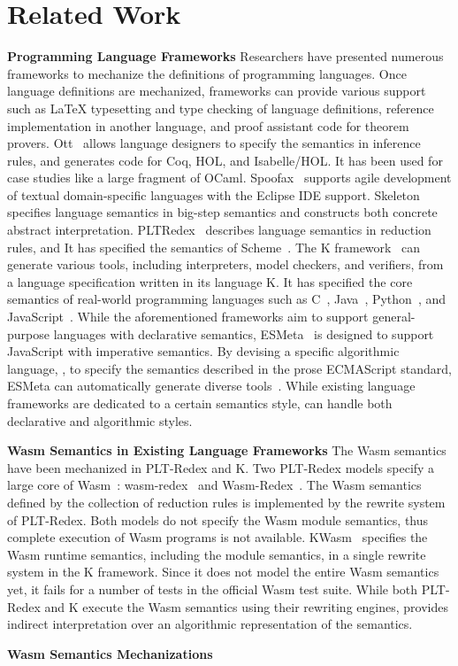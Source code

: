 
\section{Related Work}
\label{sec:related}

\textbf{Programming Language Frameworks}
Researchers have presented numerous frameworks to mechanize the
definitions of programming languages.
Once language definitions are mechanized, frameworks can provide various support
such as LaTeX typesetting and type checking of language definitions,
reference implementation in another language, and 
proof assistant code for theorem provers.
Ott~\cite{ott} allows language designers to specify the semantics in inference rules,
and generates code for Coq, HOL, and Isabelle/HOL.
It has been used for case studies like a large fragment of OCaml.
Spoofax~\cite{spoofax} supports agile development of textual
domain-specific languages with the Eclipse IDE support.
Skeleton~\cite{skeleton} specifies language semantics in big-step semantics
and constructs both concrete abstract interpretation.
PLTRedex~\cite{pltredex} describes language semantics in reduction rules,
and It has specified the semantics of Scheme~\cite{r6rs}.
The K framework~\cite{k} can generate various tools,
including interpreters, model checkers, and verifiers, from a language specification
written in its language K. It has specified the core semantics of real-world programming languages
such as C~\cite{kc}, Java~\cite{kjava}, Python~\cite{kpython}, and JavaScript~\cite{kjs}.
While the aforementioned frameworks aim to support general-purpose languages
with declarative semantics, ESMeta~\cite{esmeta} is designed to
support JavaScript with imperative semantics.
By devising a specific algorithmic language, \ires,
to specify the semantics described in the prose ECMAScript standard,
ESMeta can automatically generate diverse tools~\cite{jiset,jest,jstar,jsaver}.
While existing language frameworks are dedicated to a certain semantics style,
\dslname can handle both declarative and algorithmic styles.

\textbf{Wasm Semantics in Existing Language Frameworks}
The Wasm semantics have been mechanized in PLT-Redex and K.
Two PLT-Redex models specify a large core of Wasm~\cite{wasm-pldi17}:
wasm-redex~\cite{wasm-redex-asumu} and Wasm-Redex~\cite{wasm-redex-adam}.
The Wasm semantics defined by the collection of reduction rules is implemented
by the rewrite system of PLT-Redex.
Both models do not specify the Wasm module semantics, thus complete execution of
Wasm programs is not available.
KWasm~\cite{wasm-k} specifies the Wasm runtime semantics, including the module semantics,
in a single rewrite system in the K framework.
Since it does not model the entire Wasm semantics yet,
it fails for a number of tests in the official Wasm test suite.
While both PLT-Redex and K execute the Wasm semantics using their rewriting engines,
\dslname provides indirect interpretation over an algorithmic representation of the semantics.

\textbf{Wasm Semantics Mechanizations}
